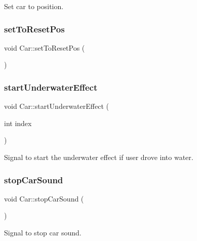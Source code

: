 Set car to position. 

\mbox{\label{class_car_ae77af82a9549c47931e4e92f78a8b552}} 
\subsubsection{\texorpdfstring{setToResetPos}{setToResetPos}}
{\footnotesize\ttfamily void Car\+::set\+To\+Reset\+Pos (\begin{DoxyParamCaption}{ }\end{DoxyParamCaption})\hspace{0.3cm}{\ttfamily [slot]}}

\mbox{\label{class_car_a841ee0e366011fd34270456fa3a26fec}} 
\subsubsection{\texorpdfstring{startUnderwaterEffect}{startUnderwaterEffect}}
{\footnotesize\ttfamily void Car\+::start\+Underwater\+Effect (\begin{DoxyParamCaption}\item[{int}]{index }\end{DoxyParamCaption})\hspace{0.3cm}{\ttfamily [signal]}}



Signal to start the underwater effect if user drove into water. 

\mbox{\label{class_car_ae0287b9c9c7d30683ea0df106b8cc028}} 
\subsubsection{\texorpdfstring{stopCarSound}{stopCarSound}}
{\footnotesize\ttfamily void Car\+::stop\+Car\+Sound (\begin{DoxyParamCaption}{ }\end{DoxyParamCaption})\hspace{0.3cm}{\ttfamily [signal]}}



Signal to stop car sound. 

